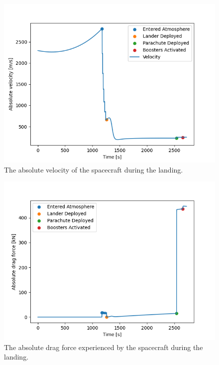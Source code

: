 \documentclass[reprint,english,notitlepage]{revtex4-2}
\begin{document}
\begin{figure}[h]
    \centering
    \includegraphics[scale=0.4]{Figures/landing_velocity}
    \caption{The absolute velocity of the spacecraft during the landing.}\label{fig:landing_velocity}
\end{figure}

\begin{figure}[h]
    \centering
    \includegraphics[scale=0.4]{Figures/landing_f_drag}
    \caption{The absolute drag force experienced by the spacecraft during the landing.}\label{fig:landing_f_drag}
\end{figure}
\end{document}
